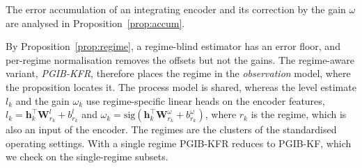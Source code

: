 \documentclass[preprint,12pt]{elsarticle}
\theoremstyle{definition}
\begin{document}
The error accumulation of an integrating encoder and its correction by the gain $\omega$ are analysed in Proposition~\ref{prop:accum}.

By Proposition~\ref{prop:regime}, a regime-blind estimator has an error floor, and per-regime normalisation removes the offsets but not the gains. The regime-aware variant, \emph{PGIB-KFR}, therefore places the regime in the \emph{observation} model, where the proposition locates it. The process model is shared, whereas the level estimate $l_k$ and the gain $\omega_k$ use regime-specific linear heads on the encoder features, $l_k=\mathbf h_k^\top\mathbf W^{l}_{r_k}+b^{l}_{r_k}$ and $\omega_k=\mathrm{sig}(\mathbf h_k^\top\mathbf W^{\omega}_{r_k}+b^{\omega}_{r_k})$, where $r_k$ is the regime, which is also an input of the encoder. The regimes are the clusters of the standardised operating settings. With a single regime PGIB-KFR reduces to PGIB-KF, which we check on the single-regime subsets.
\end{document}
